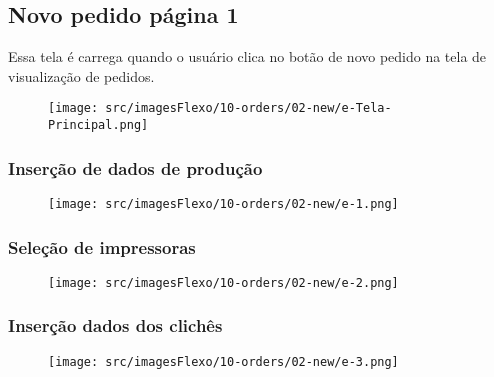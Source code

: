 \thispagestyle{fancy}
\vspace*{40 pt}
\subsection{Novo pedido página 1}
 Essa tela é carrega quando o usuário clica no botão de novo pedido na tela de visualização de pedidos.
 \vspace*{\fill}
 \begin{figure}[h]
  \centering
  \texttt{[image: src/imagesFlexo/10-orders/02-new/e-Tela-Principal.png]}
\end{figure}
\vspace*{\fill}

\newpage
\thispagestyle{fancy}
\vspace*{40 pt}
\subsubsection{\small{Inserção de dados de produção}}
\vspace*{\fill}
\begin{figure}[h]
  \centering
  \texttt{[image: src/imagesFlexo/10-orders/02-new/e-1.png]}
\end{figure}
\vspace*{\fill}

\newpage
\thispagestyle{fancy}
\vspace*{40 pt}
\subsubsection{\small{Seleção de impressoras}}
\vspace*{\fill}
\begin{figure}[h]
  \centering
  \texttt{[image: src/imagesFlexo/10-orders/02-new/e-2.png]}
\end{figure}
\vspace*{\fill}

\newpage
\thispagestyle{fancy}
\vspace*{40 pt}
\subsubsection{\small{Inserção dados dos clichês}}
\vspace*{\fill}
\begin{figure}[h]
  \centering
  \texttt{[image: src/imagesFlexo/10-orders/02-new/e-3.png]}
\end{figure}
\vspace*{\fill}

